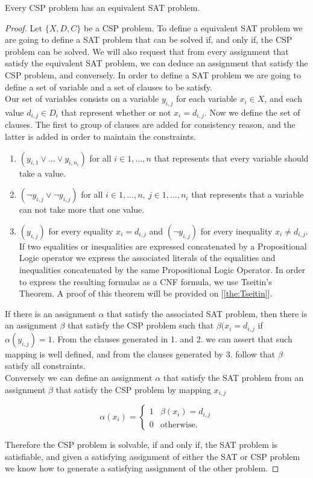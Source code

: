 \begin{proposition}
  Every CSP problem has an equivalent SAT problem.
\end{proposition}
\begin{proof}
  Let $ \{X,D,C\}$ be a CSP problem. To define a equivalent SAT problem we are going to define a SAT problem that can be solved if, and only if, the CSP problem can be solved. We will also request that from every assignment that satisfy the equivalent SAT problem, we can deduce an assignment that satisfy the CSP problem, and conversely. In order to define a SAT problem we are going to define a set of variable and a set of clauses to be satisfy.\\

  Our set of variables consists on a variable $y_{i,j}$ for each variable $x_i\in X$, and each value $d_{i,j}\in D_i$ that represent whether or not $x_i = d_{i,j}$. Now we define the set of clauses. The first to group of clauses are added for consistency reason, and the latter is added in order to maintain the constraints.
  \begin{enumerate}
  \item $(y_{i,1}\vee ... \vee y_{i,n_i})$ for all $i\in 1,...,n$ that represents that every variable should take a value.
  \item $(\neg y_{i,j} \vee \neg y_{i,j})$ for all $i\in 1,...,n,\ j\in 1,...,n_i$ that represents that a variable can not take more that one value.
  \item $(y_{i,j})$ for every equality $x_i = d_{i,j}$ and $(\neg y_{i,j})$ for every inequality $x_i \ne d_{i,j}$. If two equalities or inequalities are expressed concatenated by a Propositional Logic operator we express the associated literals of the equalities and inequalities concatenated by the same Propositional Logic Operator. In order to express the resulting formulas as a CNF formula, we use Tseitin's Theorem. A proof of this theorem will be provided on [\ref{the:Tseitin}].
  \end{enumerate}

  If there is an assignment $\alpha$ that satisfy the associated SAT problem, then there is an assignment $\beta$ that satisfy the CSP problem such that $\beta(x_i=d_{i,j}$ if $\alpha(y_{i,j}) = 1$. From the clauses generated in 1. and 2. we can assert that such mapping is well defined, and from the clauses generated by 3. follow that $\beta$ satisfy all constraints.\\

  Conversely we can define an assignment $\alpha$ that satisfy the SAT problem from an assignment $\beta$ that satisfy the CSP problem by mapping $x_{i,j}$ 

$$
\alpha(x_{i})=
\begin{cases}
  1 & \beta(x_{i}) = d_{i,j}\\
  0 & \text{otherwise}.
\end{cases}
$$

Therefore the CSP problem is solvable, if and only if, the SAT problem is satisfiable, and given a satisfying assignment of either the SAT or CSP problem we know how to generate a satisfying assignment of the other problem.
\end{proof}

